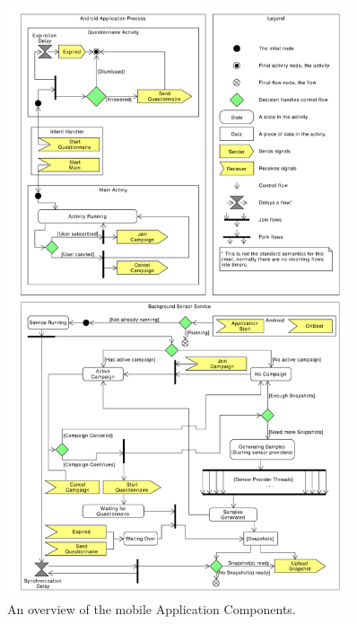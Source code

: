 \begin{figure}[!htbp]
    \centering
    \includegraphics[width=0.9\textwidth]{graphic/backgroundsensorservice/lifecyclestuff}
    \caption{An overview of the mobile Application Components.}
    \label{fig:system_currency_and_lifecycle}
\end{figure}
\FloatBarrier